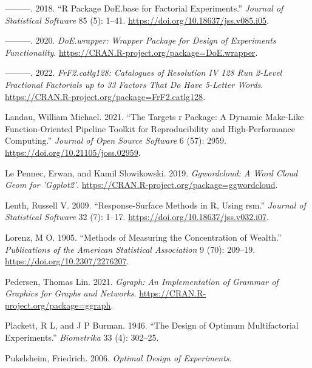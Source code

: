 \documentclass{article}
\newlength{\cslhangindent}
\newlength{\cslentryspacingunit} %
\newenvironment{CSLReferences}[2] %
 {%
  \setlength{\parindent}{0pt}
  \ifodd #1
  \let\oldpar\par
  \def\par{\hangindent=\cslhangindent\oldpar}
  \fi
  \setlength{\parskip}{#2\cslentryspacingunit}
 }%
 {}
\begin{document}
\begin{CSLReferences}{1}{0}
\leavevmode{}%
---------. 2018. {``{R} Package {DoE.base} for Factorial Experiments.''}
\emph{Journal of Statistical Software} 85 (5): 1--41.
\url{https://doi.org/10.18637/jss.v085.i05}.

\leavevmode{}%
---------. 2020. \emph{DoE.wrapper: Wrapper Package for Design of
Experiments Functionality}.
\url{https://CRAN.R-project.org/package=DoE.wrapper}.

\leavevmode{}%
---------. 2022. \emph{FrF2.catlg128: Catalogues of Resolution IV 128
Run 2-Level Fractional Factorials up to 33 Factors That Do Have 5-Letter
Words}. \url{https://CRAN.R-project.org/package=FrF2.catlg128}.

\leavevmode{}%
Landau, William Michael. 2021. {``The Targets r Package: A Dynamic
Make-Like Function-Oriented Pipeline Toolkit for Reproducibility and
High-Performance Computing.''} \emph{Journal of Open Source Software} 6
(57): 2959. \url{https://doi.org/10.21105/joss.02959}.

\leavevmode{}%
Le Pennec, Erwan, and Kamil Slowikowski. 2019. \emph{Ggwordcloud: A Word
Cloud Geom for 'Ggplot2'}.
\url{https://CRAN.R-project.org/package=ggwordcloud}.

\leavevmode{}%
Lenth, Russell V. 2009. {``Response-Surface Methods in {R}, Using
{rsm}.''} \emph{Journal of Statistical Software} 32 (7): 1--17.
\url{https://doi.org/10.18637/jss.v032.i07}.

\leavevmode{}%
Lorenz, M O. 1905. {``Methods of Measuring the Concentration of
Wealth.''} \emph{Publications of the American Statistical Association} 9
(70): 209--19. \url{https://doi.org/10.2307/2276207}.

\leavevmode{}%
Pedersen, Thomas Lin. 2021. \emph{Ggraph: An Implementation of Grammar
of Graphics for Graphs and Networks}.
\url{https://CRAN.R-project.org/package=ggraph}.

\leavevmode{}%
Plackett, R L, and J P Burman. 1946. {``The Design of Optimum
Multifactorial Experiments.''} \emph{Biometrika} 33 (4): 302--25.

\leavevmode{}%
Pukelsheim, Friedrich. 2006. \emph{Optimal Design of Experiments}.


\end{CSLReferences}
\end{document}
